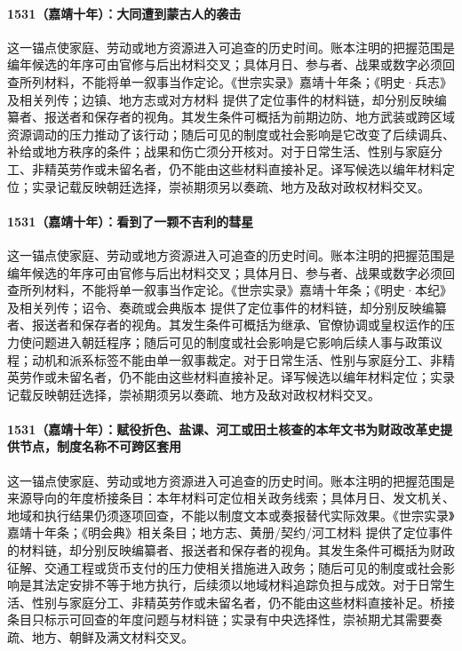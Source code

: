 \paragraph{1531（嘉靖十年）：大同遭到蒙古人的袭击} 这一锚点使家庭、劳动或地方资源进入可追查的历史时间。账本注明的把握范围是编年候选的年序可由官修与后出材料交叉；具体月日、参与者、战果或数字必须回查所列材料，不能将单一叙事当作定论。《世宗实录》嘉靖十年条；《明史·兵志》及相关列传；边镇、地方志或对方材料 提供了定位事件的材料链，却分别反映编纂者、报送者和保存者的视角。其发生条件可概括为前期边防、地方武装或跨区域资源调动的压力推动了该行动；随后可见的制度或社会影响是它改变了后续调兵、补给或地方秩序的条件；战果和伤亡须分开核对。对于日常生活、性别与家庭分工、非精英劳作或未留名者，仍不能由这些材料直接补足。译写候选以编年材料定位；实录记载反映朝廷选择，崇祯期须另以奏疏、地方及敌对政权材料交叉。

\paragraph{1531（嘉靖十年）：看到了一颗不吉利的彗星} 这一锚点使家庭、劳动或地方资源进入可追查的历史时间。账本注明的把握范围是编年候选的年序可由官修与后出材料交叉；具体月日、参与者、战果或数字必须回查所列材料，不能将单一叙事当作定论。《世宗实录》嘉靖十年条；《明史·本纪》及相关列传；诏令、奏疏或会典版本 提供了定位事件的材料链，却分别反映编纂者、报送者和保存者的视角。其发生条件可概括为继承、官僚协调或皇权运作的压力使问题进入朝廷程序；随后可见的制度或社会影响是它影响后续人事与政策议程；动机和派系标签不能由单一叙事裁定。对于日常生活、性别与家庭分工、非精英劳作或未留名者，仍不能由这些材料直接补足。译写候选以编年材料定位；实录记载反映朝廷选择，崇祯期须另以奏疏、地方及敌对政权材料交叉。

\paragraph{1531（嘉靖十年）：赋役折色、盐课、河工或田土核查的本年文书为财政改革史提供节点，制度名称不可跨区套用} 这一锚点使家庭、劳动或地方资源进入可追查的历史时间。账本注明的把握范围是来源导向的年度桥接条目：本年材料可定位相关政务线索；具体月日、发文机关、地域和执行结果仍须逐项回查，不能以制度文本或奏报替代实际效果。《世宗实录》嘉靖十年条；《明会典》相关条目；地方志、黄册/契约/河工材料 提供了定位事件的材料链，却分别反映编纂者、报送者和保存者的视角。其发生条件可概括为财政征解、交通工程或货币支付的压力使相关措施进入政务；随后可见的制度或社会影响是其法定安排不等于地方执行，后续须以地域材料追踪负担与成效。对于日常生活、性别与家庭分工、非精英劳作或未留名者，仍不能由这些材料直接补足。桥接条目只标示可回查的年度问题与材料链；实录有中央选择性，崇祯期尤其需要奏疏、地方、朝鲜及满文材料交叉。

